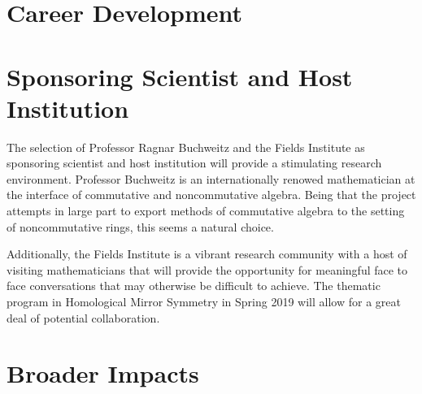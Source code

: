 \documentclass[11pt]{article}
\begin{document}
\section{Career Development}
\section{Sponsoring Scientist and Host Institution}
The selection of Professor Ragnar Buchweitz and the Fields Institute as sponsoring scientist and host institution will provide a stimulating research environment.
Professor Buchweitz is an internationally renowed mathematician at the interface of commutative and noncommutative algebra.
Being that the project attempts in large part to export methods of commutative algebra to the setting of noncommutative rings, this seems a natural choice.

Additionally, the Fields Institute is a vibrant research community with a host of visiting mathematicians that will provide the opportunity for meaningful face to face conversations that may otherwise be difficult to achieve.
The thematic program in Homological Mirror Symmetry in Spring 2019 will allow for a great deal of potential collaboration.
\section{Broader Impacts}

\newpage
\setcounter{page}{1}


\end{document}
